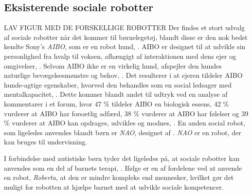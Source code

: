 \subsection{Eksisterende sociale robotter}
\label{EksisterendeSocialeRobotter}
%
LAV FIGUR MED DE FORSKELLIGE ROBOTTER\blankline
%
Der findes et stort udvalg af sociale robotter når det kommer til børnelegetøj, blandt disse er den nok bedst kendte Sony's \textit{AIBO}, som er en robot hund, \parencite{WEB:AIBO}. AIBO er designet til at udvikle sin personlighed fra hvalp til voksen, afhængigt af interaktionen med dens ejer og omgivelser, \parencite{WEB:AIBO}. Selvom AIBO ikke er en virkelig hund, afspejler den hundes naturlige bevægelsesmønstre og behov, \parencite[ss. 191-198]{PDF:AnEthologicalEmotional}. Det resulterer i at ejeren tildeler AIBO hunde-agtige egenskaber, hvorved den behandles som en social ledsager med mentalkapacitet, \parencite[s. 2]{PDF:SharingALifeHarvey}. Dette kommer blandt andet til udtryk ved en analyse af kommentarer i et forum, hvor 47 \% tildeler AIBO en biologisk essens, 42 \% vurderer at AIBO har forsætlig adfærd, 38 \% vurderer at AIBO har følelser og 39 \% vurderer at AIBO kan opdrages, udvikles og modnes, \parencite[s. 26]{PDF:InTheCompanyofRobots}. En anden social robot, som ligeledes anvendes blandt børn er \textit{NAO}, designet af \textcite{WEB:NAO}. \textit{NAO} er en robot, der kan bruges til undervisning.  

I forbindelse med autistiske børn tyder det ligeledes på, at sociale robotter kan anvendes som en del af barnets terapi, \parencite[s. 180]{PDF:GamesChrildrenAutism}. Ifølge \textcite[s. 185]{PDF:GamesChrildrenAutism} er en af fordelene ved at anvende en robot, \textit{Roberta}, at den er mindre kompleks end mennesker, hvilket gør det muligt for robotten at hjælpe barnet med at udvikle sociale kompetencer. 


